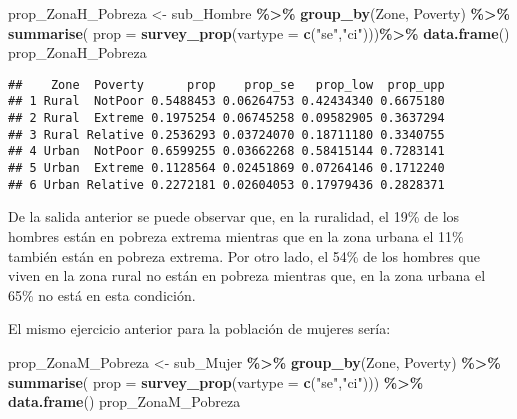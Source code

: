 \documentclass[
  12pt,
]{book}
\newenvironment{Shaded}{\begin{snugshade}}{\end{snugshade}}
\newcommand{\AttributeTok}[1]{\textcolor[rgb]{0.13,0.29,0.53}{#1}}
\newcommand{\FunctionTok}[1]{\textcolor[rgb]{0.13,0.29,0.53}{\textbf{#1}}}
\newcommand{\NormalTok}[1]{#1}
\newcommand{\OtherTok}[1]{\textcolor[rgb]{0.56,0.35,0.01}{#1}}
\newcommand{\SpecialCharTok}[1]{\textcolor[rgb]{0.81,0.36,0.00}{\textbf{#1}}}
\newcommand{\StringTok}[1]{\textcolor[rgb]{0.31,0.60,0.02}{#1}}
\begin{document}
\begin{Shaded}
\begin{Highlighting}[]
\NormalTok{prop\_ZonaH\_Pobreza }\OtherTok{\textless{}{-}}\NormalTok{ sub\_Hombre }\SpecialCharTok{\%\textgreater{}\%}
                      \FunctionTok{group\_by}\NormalTok{(Zone, Poverty) }\SpecialCharTok{\%\textgreater{}\%} 
                      \FunctionTok{summarise}\NormalTok{(}
                      \AttributeTok{prop =} \FunctionTok{survey\_prop}\NormalTok{(}\AttributeTok{vartype =} \FunctionTok{c}\NormalTok{(}\StringTok{"se"}\NormalTok{,}\StringTok{"ci"}\NormalTok{)))}\SpecialCharTok{\%\textgreater{}\%}
                      \FunctionTok{data.frame}\NormalTok{()}
\NormalTok{prop\_ZonaH\_Pobreza}
\end{Highlighting}
\end{Shaded}

\begin{verbatim}
##    Zone  Poverty      prop    prop_se   prop_low  prop_upp
## 1 Rural  NotPoor 0.5488453 0.06264753 0.42434340 0.6675180
## 2 Rural  Extreme 0.1975254 0.06745258 0.09582905 0.3637294
## 3 Rural Relative 0.2536293 0.03724070 0.18711180 0.3340755
## 4 Urban  NotPoor 0.6599255 0.03662268 0.58415144 0.7283141
## 5 Urban  Extreme 0.1128564 0.02451869 0.07264146 0.1712240
## 6 Urban Relative 0.2272181 0.02604053 0.17979436 0.2828371
\end{verbatim}

De la salida anterior se puede observar que, en la ruralidad, el 19\% de los hombres están en pobreza extrema mientras que en la zona urbana el 11\% también están en pobreza extrema. Por otro lado, el 54\% de los hombres que viven en la zona rural no están en pobreza mientras que, en la zona urbana el 65\% no está en esta condición.

El mismo ejercicio anterior para la población de mujeres sería:

\begin{Shaded}
\begin{Highlighting}[]
\NormalTok{prop\_ZonaM\_Pobreza }\OtherTok{\textless{}{-}}\NormalTok{ sub\_Mujer }\SpecialCharTok{\%\textgreater{}\%} 
                      \FunctionTok{group\_by}\NormalTok{(Zone, Poverty) }\SpecialCharTok{\%\textgreater{}\%} 
                      \FunctionTok{summarise}\NormalTok{( }\AttributeTok{prop =} \FunctionTok{survey\_prop}\NormalTok{(}\AttributeTok{vartype =} \FunctionTok{c}\NormalTok{(}\StringTok{"se"}\NormalTok{,}\StringTok{"ci"}\NormalTok{))) }\SpecialCharTok{\%\textgreater{}\%}
                      \FunctionTok{data.frame}\NormalTok{()}
\NormalTok{prop\_ZonaM\_Pobreza}
\end{Highlighting}
\end{Shaded}
\end{document}
